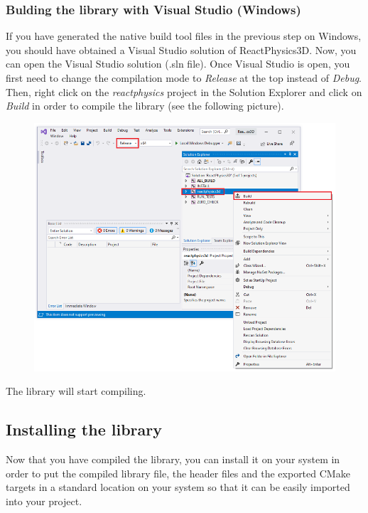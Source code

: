 \documentclass[a4paper,12pt]{article}
\begin{document}
     \subsubsection{Bulding the library with Visual Studio (Windows)}

     If you have generated the native build tool files in the previous step on Windows, you should have obtained a Visual Studio solution of ReactPhysics3D.
     Now, you can open the Visual Studio solution (.sln file). Once Visual Studio is open, you first need to change the compilation mode to \emph{Release}
     at the top instead of \emph{Debug}. Then, right click on the \emph{reactphysics} project in the Solution
     Explorer and click on \emph{Build} in order to compile the library (see the following picture).

    \begin{figure}[!ht]
        \centering
        \includegraphics[scale=0.6]{VSBuild.png}
        \label{fig:vsbuild}
    \end{figure}

    The library will start compiling.

     \subsection{Installing the library}

     Now that you have compiled the library, you can install it on your system in order to put the compiled library file, the header files and the exported
     CMake targets in a standard location on your system so that it can be easily imported into your project.
    
\end{document}
